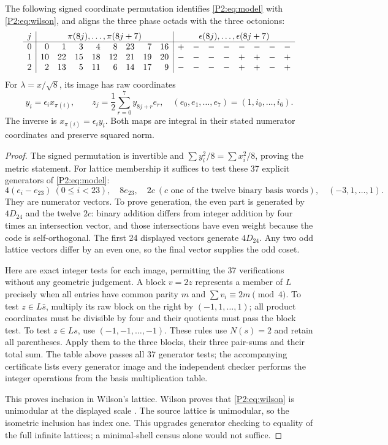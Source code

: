 \begin{theorem}\label{P2:thm:isometry}
The following signed coordinate permutation identifies \eqref{P2:eq:model} with \eqref{P2:eq:wilson}, and aligns the three phase octads with the three octonions:
\[
\begin{array}{c|rrrrrrrr|rrrrrrrr}
j&\multicolumn{8}{c|}{\pi(8j),\ldots,\pi(8j+7)}&\multicolumn{8}{c}{\epsilon(8j),\ldots,\epsilon(8j+7)}\\\hline
0&0&1&3&4&8&23&7&16&+&-&-&-&-&-&-&-\\
1&10&22&15&18&12&21&19&20&-&-&-&-&+&+&-&+\\
2&2&13&5&11&6&14&17&9&-&-&-&-&+&+&-&+
\end{array}
\]
For $\lambda=x/\sqrt8$, its image has raw coordinates
\[
y_i=\epsilon_i x_{\pi(i)},\qquad
z_j=\frac12\sum_{r=0}^7y_{8j+r}e_r,
\quad(e_0,e_1,\ldots,e_7)=(1,i_0,\ldots,i_6).
\]
The inverse is $x_{\pi(i)}=\epsilon_i y_i$. Both maps are integral in their stated numerator coordinates and preserve squared norm.
\end{theorem}
\begin{proof}
The signed permutation is invertible and $\sum y_i^2/8=\sum x_i^2/8$, proving the metric statement. For lattice membership it suffices to test these 37 explicit generators of \eqref{P2:eq:model}:
\[
4(e_i-e_{23})\ (0\le i<23),\quad8e_{23},\quad
2c\ (c\text{ one of the twelve binary basis words}),\quad
(-3,1,\ldots,1).
\]
They are numerator vectors. To prove generation, the even part is generated by $4D_{24}$ and the twelve $2c$: binary addition differs from integer addition by four times an intersection vector, and those intersections have even weight because the code is self-orthogonal. The first 24 displayed vectors generate $4D_{24}$. Any two odd lattice vectors differ by an even one, so the final vector supplies the odd coset.

Here are exact integer tests for each image, permitting the 37 verifications without any geometric judgement. A block $v=2z$ represents a member of $L$ precisely when all entries have common parity $m$ and $\sum v_i\equiv2m\pmod4$. To test $z\in L\bar s$, multiply its raw block on the right by $(-1,1,\ldots,1)$; all product coordinates must be divisible by four and their quotients must pass the block test. To test $z\in Ls$, use $(-1,-1,\ldots,-1)$. These rules use $N(s)=2$ and retain all parentheses. Apply them to the three blocks, their three pair-sums and their total sum. The table above passes all 37 generator tests; the accompanying certificate lists every generator image and the independent checker performs the integer operations from the basis multiplication table.

This proves inclusion in Wilson's lattice. Wilson proves that \eqref{P2:eq:wilson} is unimodular at the displayed scale \cite[Sections 3--4]{wilson}. The source lattice is unimodular, so the isometric inclusion has index one. This upgrades generator checking to equality of the full infinite lattices; a minimal-shell census alone would not suffice.
\end{proof}
